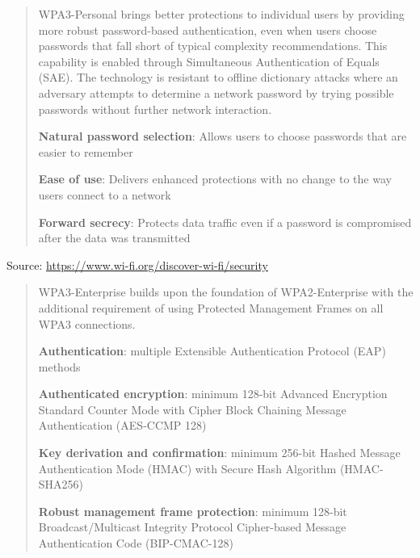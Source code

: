 \documentclass[Screen16to9,17pt]{foils}
\begin{document}

\begin{quote}
WPA3-Personal brings better protections to individual users by providing more robust password-based authentication, even when users choose passwords that fall short of typical complexity recommendations. This capability is enabled through Simultaneous Authentication of Equals (SAE). The technology is resistant to offline dictionary attacks where an adversary attempts to determine a network password by trying possible passwords without further network interaction.

\begin{list2}
\item {\bf Natural password selection}: Allows users to choose passwords that are easier to remember
\item {\bf Ease of use}: Delivers enhanced protections with no change to the way users connect to a network
\item {\bf Forward secrecy}: Protects data traffic even if a password is compromised after the data was transmitted
\end{list2}
\end{quote}

Source: \url{https://www.wi-fi.org/discover-wi-fi/security}




\begin{quote}
WPA3-Enterprise builds upon the foundation of WPA2-Enterprise with the additional requirement of using Protected Management Frames on all WPA3 connections.

\begin{list2}
\item {\bf Authentication}: multiple Extensible Authentication Protocol (EAP) methods
\item {\bf Authenticated encryption}: minimum 128-bit Advanced Encryption Standard Counter Mode with Cipher Block Chaining Message Authentication (AES-CCMP 128)
\item {\bf Key derivation and confirmation}: minimum 256-bit Hashed Message Authentication Mode (HMAC) with Secure Hash Algorithm (HMAC-SHA256)
\item {\bf Robust management frame protection}: minimum 128-bit Broadcast/Multicast Integrity Protocol Cipher-based Message Authentication Code (BIP-CMAC-128)
\end{list2}
\end{quote}
\end{document}
